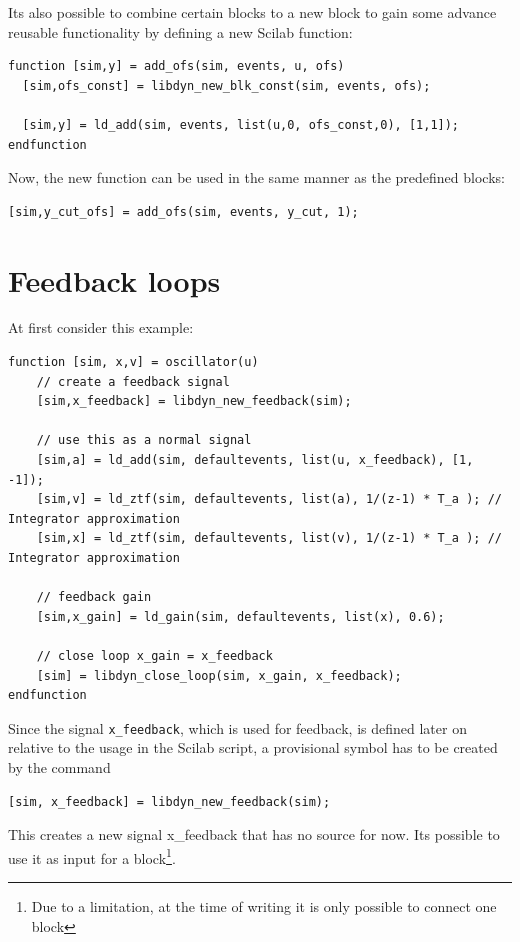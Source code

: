 \documentclass[%
	pdftex,%
	a4paper,%
	oneside,%
	11pt,%
	halfparskip,%
	headsepline,%
	bibtotocnumbered,%
	idxtotoc%
]{scrartcl}
\begin{document}
Its also possible to combine certain blocks to a new block to gain some advance reusable functionality by defining a new Scilab function:

\begin{verbatim}
function [sim,y] = add_ofs(sim, events, u, ofs)
  [sim,ofs_const] = libdyn_new_blk_const(sim, events, ofs);
  
  [sim,y] = ld_add(sim, events, list(u,0, ofs_const,0), [1,1]);
endfunction
\end{verbatim}

Now, the new function can be used in the same manner as the predefined blocks:

\begin{verbatim}
[sim,y_cut_ofs] = add_ofs(sim, events, y_cut, 1);
\end{verbatim}

\section{Feedback loops}

At first consider this example:

\begin{verbatim}
function [sim, x,v] = oscillator(u)
    // create a feedback signal
    [sim,x_feedback] = libdyn_new_feedback(sim);

    // use this as a normal signal
    [sim,a] = ld_add(sim, defaultevents, list(u, x_feedback), [1, -1]);
    [sim,v] = ld_ztf(sim, defaultevents, list(a), 1/(z-1) * T_a ); // Integrator approximation
    [sim,x] = ld_ztf(sim, defaultevents, list(v), 1/(z-1) * T_a ); // Integrator approximation  
    
    // feedback gain
    [sim,x_gain] = ld_gain(sim, defaultevents, list(x), 0.6);
    
    // close loop x_gain = x_feedback
    [sim] = libdyn_close_loop(sim, x_gain, x_feedback);
endfunction
\end{verbatim}

Since the signal \texttt{x\_feedback}, which is used for feedback, is defined later on relative to the usage in the Scilab script, a provisional symbol has to be created by the command

\begin{verbatim}
[sim, x_feedback] = libdyn_new_feedback(sim);
\end{verbatim}

This creates a new signal x\_feedback that has no source for now. Its possible to use it as input for a block\footnote{Due to a limitation, at the time of writing it is only possible to connect one block}.
\end{document}
